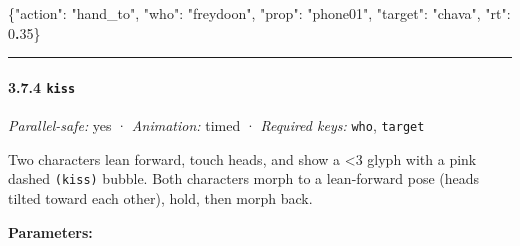 \documentclass[
  12pt,
  letterpaper,
]{book}
\newenvironment{Shaded}{}{}
\newcommand{\DataTypeTok}[1]{\textcolor[rgb]{0.56,0.13,0.00}{#1}}
\newcommand{\DecValTok}[1]{\textcolor[rgb]{0.25,0.63,0.44}{#1}}
\newcommand{\ErrorTok}[1]{\textcolor[rgb]{1.00,0.00,0.00}{\textbf{#1}}}
\newcommand{\FunctionTok}[1]{\textcolor[rgb]{0.02,0.16,0.49}{#1}}
\newcommand{\StringTok}[1]{\textcolor[rgb]{0.25,0.44,0.63}{#1}}
\begin{document}
\begin{Shaded}
\begin{Highlighting}[]
\FunctionTok{\{}\DataTypeTok{"action"}\FunctionTok{:} \StringTok{"hand\_to"}\FunctionTok{,} \DataTypeTok{"who"}\FunctionTok{:} \StringTok{"freydoon"}\FunctionTok{,} \DataTypeTok{"prop"}\FunctionTok{:} \StringTok{"phone01"}\FunctionTok{,}
 \DataTypeTok{"target"}\FunctionTok{:} \StringTok{"chava"}\FunctionTok{,} \DataTypeTok{"rt"}\FunctionTok{:} \DecValTok{0}\ErrorTok{.}\DecValTok{35}\FunctionTok{\}}
\end{Highlighting}
\end{Shaded}

\begin{center}\rule{0.5\linewidth}{0.5pt}\end{center}

\paragraph{\texorpdfstring{3.7.4 \texttt{kiss}}{3.7.4 kiss}}\label{kiss}

\emph{Parallel-safe:} yes · \emph{Animation:} timed · \emph{Required
keys:} \texttt{who}, \texttt{target}

Two characters lean forward, touch heads, and show a \textless3 glyph
with a pink dashed \texttt{(kiss)} bubble. Both characters morph to a
lean-forward pose (heads tilted toward each other), hold, then morph
back.

\textbf{Parameters:}
\end{document}
